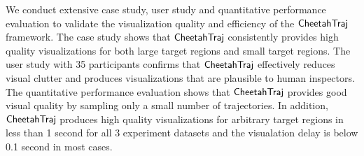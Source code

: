 



We conduct extensive case study, user study and quantitative performance evaluation to validate the visualization quality and efficiency of the $\mathsf{CheetahTraj}$ framework. The case study shows that $\mathsf{CheetahTraj}$ consistently provides high quality visualizations for both large target regions and small target regions. The user study with 35 participants confirms that $\mathsf{CheetahTraj}$ effectively reduces visual clutter and produces visualizations that are plausible to human inspectors. The quantitative performance evaluation shows that $\mathsf{CheetahTraj}$ provides good visual quality by sampling only a small number of trajectories. In addition,  $\mathsf{CheetahTraj}$ produces high quality visualizations for arbitrary target regions in less than 1 second for all 3 experiment datasets and the visualation delay is below 0.1 second in most cases.



